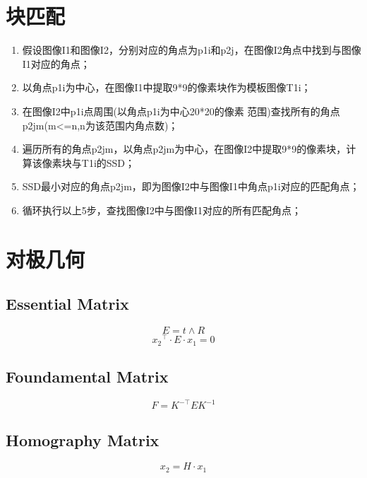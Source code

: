 \section{块匹配}
\begin{enumerate}  
\item 假设图像I1和图像I2，分别对应的角点为p1i和p2j，在图像I2角点中找到与图像I1对应的角点；
\item 以角点p1i为中心，在图像I1中提取9*9的像素块作为模板图像T1i；
\item 在图像I2中p1i点周围(以角点p1i为中心20*20的像素 范围)查找所有的角点p2jm(m<=n,n为该范围内角点数)；
\item 遍历所有的角点p2jm，以角点p2jm为中心，在图像I2中提取9*9的像素块，计算该像素块与T1i的SSD；
\item SSD最小对应的角点p2jm，即为图像I2中与图像I1中角点p1i对应的匹配角点；
\item 循环执行以上5步，查找图像I2中与图像I1对应的所有匹配角点；
\end{enumerate}


\section{对极几何}

\subsection{Essential Matrix}
\begin{equation} E = t \wedge R \end{equation}
\begin{equation} {x_2}^\top \cdot E \cdot x_1 = 0 \end{equation}
 
\subsection{Foundamental Matrix}
\begin{equation} F = K^{-\top} E K^{-1} \end{equation}

\subsection{Homography Matrix}
\begin{equation} x_2 = H \cdot x_1 \end{equation}
